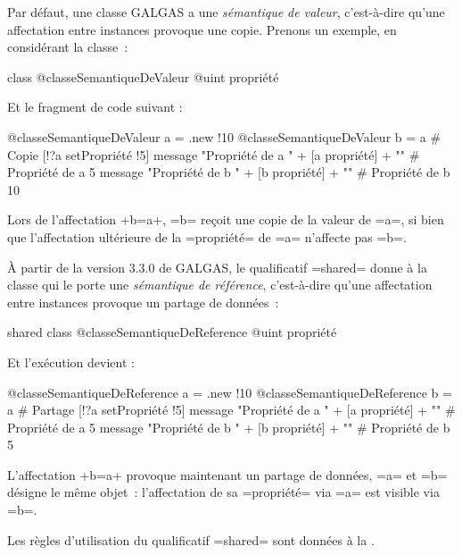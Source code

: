 
Par défaut, une classe GALGAS a une \emph{sémantique de valeur}, c'est-à-dire qu'une affectation entre instances provoque une copie. Prenons un exemple, en considérant la classe~:

\begin{galgas}
class @classeSemantiqueDeValeur {
  @uint propriété
}
\end{galgas}

Et le fragment de code suivant :

\begin{galgas}
@classeSemantiqueDeValeur a = .new {!10}
@classeSemantiqueDeValeur b = a # Copie
[!?a setPropriété !5]
message "Propriété de a " + [a propriété] + "\n" # Propriété de a 5
message "Propriété de b " + [b propriété] + "\n" # Propriété de b 10
\end{galgas}

Lors de l'affectation \ggs+b=a+, \ggs=b= reçoit une copie de la valeur de \ggs=a=, si bien que l'affectation ultérieure de la \ggs=propriété= de \ggs=a= n'affecte pas \ggs=b=.

 À partir de la version 3.3.0 de GALGAS, le qualificatif \ggs=shared= donne à la classe qui le porte une \emph{sémantique de référence}, c'est-à-dire qu'une affectation entre instances provoque un partage de données~:

\begin{galgas}
shared class @classeSemantiqueDeReference {
  @uint propriété
}
\end{galgas}

Et l'exécution devient :

\begin{galgas}
@classeSemantiqueDeReference a = .new {!10}
@classeSemantiqueDeReference b = a # Partage
[!?a setPropriété !5]
message "Propriété de a " + [a propriété] + "\n" # Propriété de a 5
message "Propriété de b " + [b propriété] + "\n" # Propriété de b 5
\end{galgas}

L'affectation \ggs+b=a+ provoque maintenant un partage de données, \ggs=a= et \ggs=b= désigne le même objet~: l'affectation de sa \ggs=propriété= via \ggs=a= est visible via \ggs=b=.

Les règles d'utilisation du qualificatif \ggs=shared= sont données à la .








